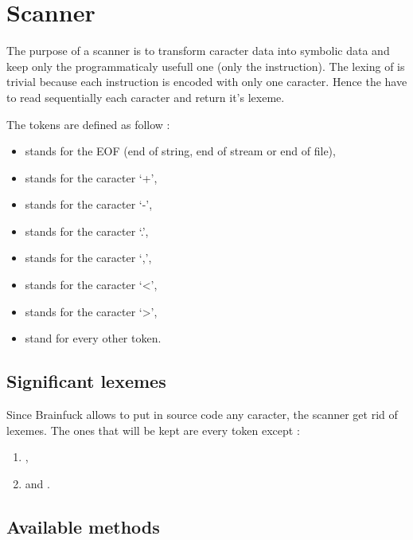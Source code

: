 \section{Scanner}%
The purpose of a scanner is to transform caracter data into symbolic data and keep only the programmaticaly usefull one (\ie only the instruction). The lexing of \brainfuck is trivial because each instruction is encoded with only one caracter. Hence the  have to read sequentially each caracter and return it's \gls{lexeme}.

The tokens are defined as follow :
\begin{itemize}
        \item {} stands for the EOF (\ie end of string, end of stream or end of file),

        \item {} stands for the caracter `+',
        \item {} stands for the caracter `-',
        \item {} stands for the caracter `.',
        \item {} stands for the caracter `,',
        \item {} stands for the caracter `<',
        \item {} stands for the caracter `>',

        \item {} stand for every other token.
\end{itemize}

\subsection{Significant lexemes\label{significantLexemes}}
Since Brainfuck allows to put in source code any caracter, the scanner get rid of lexemes. The ones that will be kept are every token except :
\begin{enumerate}
        \item {},
        \item and .
\end{enumerate}

\subsection{Available methods}
